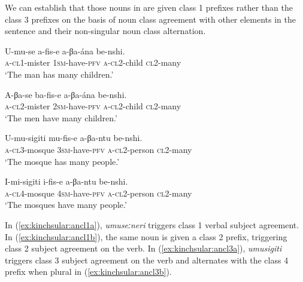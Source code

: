 \documentclass[output=paper,colorlinks,citecolor=brown,
]{langscibook}
\begin{document}
We can establish that those nouns in  are given class 1 prefixes rather than the class 3 prefixes on the basis of noun class agreement with other elements in the sentence and their non-singular noun class alternation.  

\ea \label{ex:kinchsular:ancl1}
\begin{xlist}

\ex \label{ex:kinchsular:ancl1a}
\gll U-mu-se a-fis-e a-βa-ána be-nshi. \\ 
\textsc{a}-\textsc{cl1}-mister \textsc{1sm}-have-\textsc{pfv} \textsc{a}-\textsc{cl2}-child \textsc{cl2}-many \\
\glt `The man has many children.'

\ex \label{ex:kinchsular:ancl1b}
\gll A-βa-se ba-fis-e a-βa-ána be-nshi. \\ 
\textsc{a}-\textsc{cl2}-mister \textsc{2sm}-have-\textsc{pfv} \textsc{a}-\textsc{cl2}-child \textsc{cl2}-many  \\
\glt `The men have many children.'

\end{xlist}

\z 

\ea \label{ex:kinchsular:ancl3}
\begin{xlist}

\ex \label{ex:kinchsular:ancl3a}
\gll U-mu-sigiti mu-fis-e a-βa-ntu be-nshi. \\ 
\textsc{a}-\textsc{cl3}-mosque \textsc{3sm}-have-\textsc{pfv} \textsc{a}-\textsc{cl2}-person \textsc{cl2}-many \\
\glt `The mosque has many people.'

\ex \label{ex:kinchsular:ancl3b}
\gll I-mi-sigiti i-fis-e a-βa-ntu be-nshi. \\ 
\textsc{a}-\textsc{cl4}-mosque \textsc{4sm}-have-\textsc{pfv} \textsc{a}-\textsc{cl2}-person \textsc{cl2}-many  \\
\glt `The mosques have many people.'

\end{xlist}

\z 

In (\ref{ex:kinchsular:ancl1a}), \textit{umuseːneri} triggers class 1 verbal subject agreement. In (\ref{ex:kinchsular:ancl1b}), the same noun is given a class 2 prefix, triggering class 2 subject agreement on the verb. In (\ref{ex:kinchsular:ancl3a}), \textit{umusigiti} triggers class 3 subject agreement on the verb and alternates with the class 4 prefix when plural in (\ref{ex:kinchsular:ancl3b}).
\end{document}
